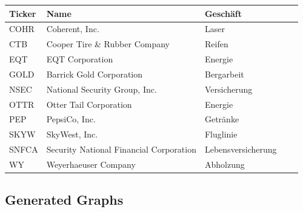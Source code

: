 \documentclass[12pt]{article}
\begin{document}
            \begin{table}[htp]
                \begin{center}
                    
                    \begin{tabular}{ | l | l | l | l | l | }

                        \hline
                        \textbf{Ticker}      & \textbf{Name}                             & \textbf{Geschäft} \\
                        \hline
                        COHR                 & Coherent, Inc.                            & Laser \\
                        CTB                  & Cooper Tire \& Rubber Company             & Reifen \\
                        EQT                  & EQT Corporation                           & Energie \\
                        GOLD                 & Barrick Gold Corporation                  & Bergarbeit \\
                        NSEC                 & National Security Group, Inc.             & Versicherung \\
                        OTTR                 & Otter Tail Corporation                    & Energie \\
                        PEP                  & PepsiCo, Inc.                             & Getränke \\
                        SKYW                 & SkyWest, Inc.                             & Fluglinie \\
                        SNFCA                & Security National Financial Corporation   & Lebensversicherung \\
                        WY                   & Weyerhaeuser Company                      & Abholzung \\
                        \hline

                    \end{tabular}

                \end{center}
            \end{table}

        \subsection{Generated Graphs}
        
\end{document}
